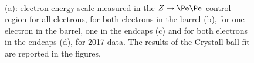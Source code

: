 \begin{figure}[!htb]
\begin{center}
 \\
\end{center}
\caption{
(a): electron energy scale measured in the $Z\rightarrow \Pe \Pe$ control region for all electrons, for both electrons in the barrel (b), for one electron in the barrel, one in the endcaps (c) and for both electrons in the endcaps (d), for 2017 data.
The results of the Crystall-ball fit are reported in the figures.
}
\label{fig:ele_energy_scaleB}
\end{figure}

